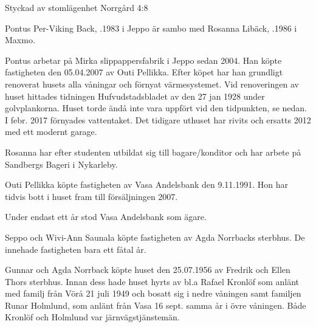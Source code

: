 %

Styckad av stomlägenhet Norrgård 4:8


%

Pontus Per-Viking Back, .1983 i Jeppo är sambo med Rosanna Libäck, .1986 i Maxmo.
\begin{jhchildren}
  \item {}
  \item {}
\end{jhchildren}

Pontus arbetar på Mirka slippappersfabrik i Jeppo sedan 2004. Han köpte fastigheten den 05.04.2007 av Outi Pellikka. Efter köpet har han grundligt renoverat husets alla våningar och förnyat värmesystemet. Vid renoveringen av huset hittades tidningen Hufvudstadsbladet av	den 27 jan 1928 under golvplankorna. Huset torde ändå inte vara	uppfört vid den tidpunkten, se nedan. I febr. 2017 förnyades vattentaket. Det tidigare uthuset har rivits och ersatts 2012 med ett modernt garage.

Rosanna har efter studenten utbildat sig till bagare/konditor och	har arbete på Sandbergs Bageri i Nykarleby.


%

Outi Pellikka köpte fastigheten av Vasa Andelsbank den 9.11.1991. Hon har tidvis bott i huset fram till försäljningen 2007.\jhvspace{}


%
Under endast ett år stod Vasa Andelsbank som ägare.\jhvspace{}


%
Seppo och Wivi-Ann Saunala köpte fastigheten av Agda Norrbacks sterbhus. De innehade fastigheten bara ett fåtal år.\jhvspace{}


%
Gunnar och Agda Norrback köpte huset den 25.07.1956 av Fredrik och Ellen Thors sterbhus. Innan dess hade huset hyrts av bl.a Rafael Kronlöf som anlänt med familj från Vörå 21 juli 1949 och bosatt sig i	nedre våningen samt familjen Runar Holmlund, som anlänt från Vasa 16 sept. samma år i övre våningen. Både Kronlöf och Holmlund var järnvägstjänstemän.

